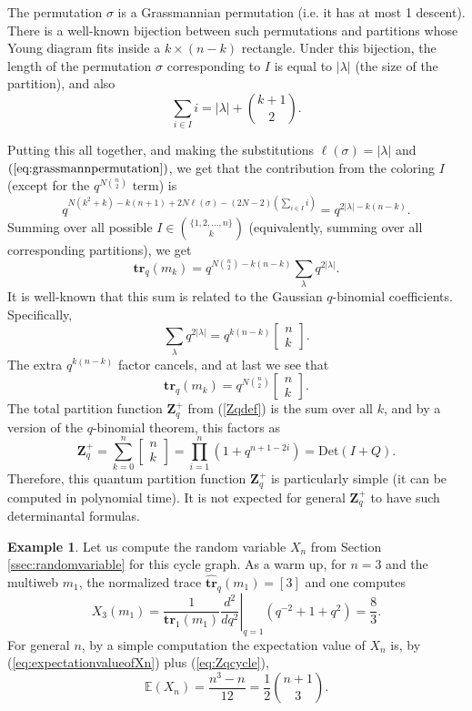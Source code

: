 \documentclass[12pt, reqno]{amsart}
\theoremstyle{definition}
\newtheorem{exam}[theo]{Example}
\renewcommand{\hat}{\widehat}
\newcommand{\be}{\begin{equation}}
\newcommand{\ee}{\end{equation}}
\newcommand{\Zq}{\mathbf{Z}_q}%
\newcommand{\E}{\mathbb{E}}%
\newcommand{\Det}{\mathrm{Det}}%
\newcommand{\trq}{\mathbf{tr}_q}%
\newcommand{\htrq}{\hat{\mathbf{tr}}_q}%
\begin{document}
The permutation $\sigma$ is a Grassmannian permutation (i.e. it has at most 1 descent). There is a well-known bijection between such permutations and partitions whose Young diagram fits inside a $k \times (n-k)$ rectangle.   Under this bijection, the length of the permutation $\sigma$ corresponding to $I$ is equal to $|\lambda|$ (the size of the partition), and also
\be\label{eq:grassmannpermutation} 
\sum_{i \in I} i = |\lambda| + \binom{k+1}{2}.
\ee 

Putting this all together, and making the substitutions $\ell(\sigma) = |\lambda|$ and $(\ref{eq:grassmannpermutation})$, we get that the contribution from the coloring $I$ (except for the $q^{N\binom{n}{2}}$ term) is 
$$
q^{N(k^2+k) - k(n+1)+2N  \ell(\sigma) - (2N-2)\left(\sum_{i \in I} i\right)}=q^{2|\lambda| - k(n-k)}.
$$ 
Summing over all possible $I \in \binom{\{1,2,\dots,n\}}{k}$ (equivalently, summing over all corresponding partitions), we get
$$ 
\trq(m_k) = q^{N\binom{n}{2}-k(n-k)} \sum_\lambda q^{2{|\lambda|}}. 
$$
It is well-known that this sum is related to the Gaussian $q$-binomial coefficients. Specifically, 
$$
\sum_\lambda q^{2|\lambda|} = q^{k(n-k)} \begin{bmatrix} n \\ k \end{bmatrix}.
$$ 
The extra $q^{k(n-k)}$ factor cancels, and at last we see that 
$$
\trq(m_k) = q^{N\binom{n}{2}}\begin{bmatrix} n \\ k \end{bmatrix}. 
$$ 
The total partition function $\Zq^+$ from (\ref{Zqdef}) is the sum over all $k$, and by a version of the $q$-binomial theorem, this factors as
\be\label{eq:Zqcycle} 
\Zq^+ = \sum_{k=0}^n \begin{bmatrix} n \\ k \end{bmatrix}  = \prod_{i=1}^n (1 + q^{n+1-2i}) = \Det(I+Q). 
\ee
Therefore, this quantum partition function $\Zq^+$ is particularly simple (it can be computed in polynomial time).  It is not expected for general $\Zq^+$ to have such determinantal formulas.

\begin{exam}
Let us compute the random variable $X_n$ from Section \ref{ssec:randomvariable} for this cycle graph.  
As a warm up, for $n=3$ and the multiweb $m_1$, the normalized trace $\htrq(m_1)=[3]$ and one computes 
$$
X_3(m_1)=\frac{1}{\mathbf{tr}_1(m_1)}\left.\frac{d^2}{dq^2}\right|_{q=1}(q^{-2}+1+q^2)=\frac{8}{3}.
$$  
For general $n$, by a simple computation the expectation value of $X_n$ is, by (\ref{eq:expectationvalueofXn}) plus (\ref{eq:Zqcycle}), 
$$
\E(X_n)=\frac{n^3-n}{12} = \frac{1}{2} \binom{n+1}{3}.
$$
\end{exam}
\end{document}
